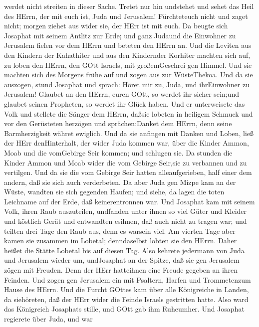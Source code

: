 werdet nicht streiten in dieser Sache. Tretet nur hin undstehet und
sehet das Heil des HErrn, der mit euch ist, Juda und Jerusalem!
Fürchteteuch nicht und zaget nicht; morgen ziehet aus wider sie, der
HErr ist mit euch.  Da beugte sich Josaphat mit seinem
Antlitz zur Erde; und ganz Judaund die Einwohner zu Jerusalem fielen vor
dem HErrn und beteten den HErrn an.  Und die Leviten aus
den Kindern der Kahathiter und aus den Kindernder Korhiter machten sich
auf, zu loben den HErrn, den GOtt Israels, mit großemGeschrei gen
Himmel.  Und sie machten sich des Morgens frühe auf und
zogen aus zur WüsteThekoa. Und da sie auszogen, stund Josaphat und
sprach: Höret mir zu, Juda, und ihrEinwohner zu Jerusalem! Glaubet an
den HErrn, euren GOtt, so werdet ihr sicher sein;und glaubet seinen
Propheten, so werdet ihr Glück haben.  Und er unterweisete
das Volk und stellete die Sänger dem HErrn, daßsie lobeten in heiligem
Schmuck und vor den Gerüsteten herzögen und sprächen:Danket dem HErrn,
denn seine Barmherzigkeit währet ewiglich.  Und da sie
anfingen mit Danken und Loben, ließ der HErr denHinterhalt, der wider
Juda kommen war, über die Kinder Ammon, Moab und die vomGebirge Seir
kommen; und schlugen sie.  Da stunden die Kinder Ammon und
Moab wider die vom Gebirge Seir,sie zu verbannen und zu vertilgen. Und
da sie die vom Gebirge Seir hatten alleaufgerieben, half einer dem
andern, daß sie sich auch verderbeten.  Da aber Juda gen
Mizpe kam an der Wüste, wandten sie sich gegenden Haufen; und siehe, da
lagen die toten Leichname auf der Erde, daß keinerentronnen war.
 Und Josaphat kam mit seinem Volk, ihren Raub auszuteilen,
undfanden unter ihnen so viel Güter und Kleider und köstlich Gerät und
entwandten esihnen, daß auch nicht zu tragen war; und teilten drei Tage
den Raub aus, denn es warsein viel.  Am vierten Tage aber
kamen sie zusammen im Lobetal; denndaselbst lobten sie den HErrn. Daher
heißet die Stätte Lobetal bis auf diesen Tag.  Also kehrete
jedermann von Juda und Jerusalem wieder um, undJosaphat an der Spitze,
daß sie gen Jerusalem zögen mit Freuden. Denn der HErr hatteihnen eine
Freude gegeben an ihren Feinden.  Und zogen gen Jerusalem
ein mit Psaltern, Harfen und Trommetenzum Hause des HErrn. 
Und die Furcht GOttes kam über alle Königreiche in Landen, da
siehöreten, daß der HErr wider die Feinde Israels gestritten hatte.
 Also ward das Königreich Josaphats stille, und GOtt gab
ihm Ruheumher.  Und Josaphat regierete über Juda, und war
